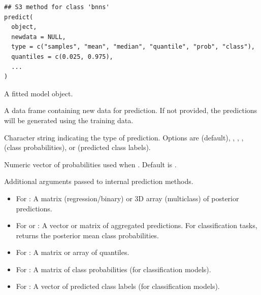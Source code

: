 \documentclass[a4paper]{book}
\begin{document}
%
\begin{Usage}
\begin{verbatim}
## S3 method for class 'bnns'
predict(
  object,
  newdata = NULL,
  type = c("samples", "mean", "median", "quantile", "prob", "class"),
  quantiles = c(0.025, 0.975),
  ...
)
\end{verbatim}
\end{Usage}
%
\begin{Arguments}
\begin{ldescription}
\item[\code{object}] A fitted  model object.

\item[\code{newdata}] A data frame containing new data for prediction. If not provided,
the predictions will be generated using the training data.

\item[\code{type}] Character string indicating the type of prediction.
Options are  (default), , , ,
 (class probabilities), or  (predicted class labels).

\item[\code{quantiles}] Numeric vector of probabilities used when .
Default is .

\item[\code{...}] Additional arguments passed to internal prediction methods.
\end{ldescription}
\end{Arguments}
%
\begin{Value}
\begin{itemize}

\item{} For : A matrix (regression/binary) or 3D array (multiclass) of posterior predictions.
\item{} For  or : A vector or matrix of aggregated predictions. For classification tasks,  returns the posterior mean class probabilities.
\item{} For : A matrix or array of quantiles.
\item{} For : A matrix of class probabilities (for classification models).
\item{} For : A vector of predicted class labels (for classification models).

\end{itemize}

\end{Value}
\end{document}

